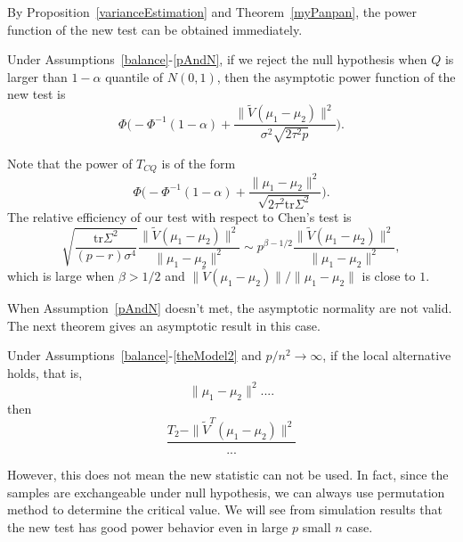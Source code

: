 
By Proposition~\ref{varianceEstimation}  and Theorem~\ref{myPanpan}, the power function of the new test can be obtained immediately.


\begin{corollary}\label{testPowerh}
    Under Assumptions~\ref{balance}-\ref{pAndN},
    if we reject the null hypothesis when $Q$ is larger than $1-\alpha$ quantile of $N(0,1)$, then the asymptotic power function of the new test is
    \begin{equation*}
        \Phi\Big(-\Phi^{-1}(1-\alpha)+\frac{\|\tilde{V}(\mu_1-\mu_2)\|^2}{\sigma^2\sqrt{2\tau^2p}}\Big).
    \end{equation*}
\end{corollary}


 Note that the power of $T_{CQ}$ is of the form
\begin{equation*}
    \Phi\Big(-\Phi^{-1}(1-\alpha)+\frac{\|\mu_1-\mu_2\|^2}{\sqrt{2\tau^2\mathrm{tr}\Sigma^2}}\Big).
\end{equation*}
 The relative efficiency of our test with respect to Chen's test is
\begin{equation*}
    \sqrt{\frac{\mathrm{tr}\Sigma^2}{(p-r)\sigma^4}}\frac{\|\tilde{V}(\mu_1-\mu_2)\|^2}{\|\mu_1-\mu_2\|^2}\sim p^{\beta-1/2}\frac{\|\tilde{V}(\mu_1-\mu_2)\|^2}{\|\mu_1-\mu_2\|^2},
\end{equation*}
which is large when $\beta>1/2$ and $\|\tilde{V}(\mu_1-\mu_2)\|/\|\mu_1-\mu_2\|$ is close to $1$.


When Assumption~\ref{pAndN} doesn't met, the asymptotic normality are not valid.
The next theorem  gives an asymptotic result in this case.
\begin{theorem}
    Under Assumptions~\ref{balance}-\ref{theModel2} and $p/n^2\to \infty$,
if the local alternative holds, that is,
    $$\|\mu_1-\mu_2\|^2....$$
then 
\begin{equation*}
    \frac{T_2-\|\tilde{V}^T(\mu_1-\mu_2)\|^2}{...}
\end{equation*}
\end{theorem}
However, this does not mean the new statistic can not be used.
In fact, since the samples are exchangeable under null hypothesis, we can always use permutation method to determine the critical value.
We will see from simulation results that the new test has good power behavior even in large $p$ small $n$ case.



